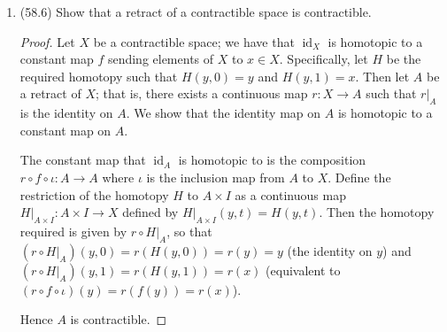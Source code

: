 \documentclass[11pt]{article}
\newcommand{\cbr}[1]{\left\{#1\right\}}
\DeclareMathOperator{\id}{id}
\begin{document}
\begin{enumerate}
\begin{proof}
      Conversely, suppose that $\id_X$ is homotopic to a constant map $f$ on $X$ mapping $X$ to some point $x\in X$. We can take the subspace $\cbr{x}$ to be the one-point space desired. Using the inclusion map $\iota$ from $\cbr{x}$ into $X$, and defining $g$ to be the map $f$ with the range restricted to $\cbr{x}$, we have that $\iota\circ g$ is equivalent to the map $f$, which is homotopic to the identity map. Similarly, the map $g\circ \iota$ is a map from $\cbr{x}$ to itself which is homotopic to the identity map on $\cbr{x}$ (since that is just what the composition is anyways). Thus $X$ has the homotopy type of a one-point space.

      Hence $X$ is contractible if and only if $X$ has the homotopy type of a one-point space.
    \end{proof}
    \item (58.6) Show that a retract of a contractible space is contractible.
    \begin{proof}
      Let $X$ be a contractible space; we have that $\id_X$ is homotopic to a constant map $f$ sending elements of $X$ to $x\in X$. Specifically, let $H$ be the required homotopy such that $H(y,0) = y$ and $H(y,1) = x$. Then let $A$ be a retract of $X$; that is, there exists a continuous map $r\colon X\to A$ such that $r|_A$ is the identity on $A$. We show that the identity map on $A$ is homotopic to a constant map on $A$. 

      The constant map that $\id_A$ is homotopic to is the composition $r\circ f\circ \iota\colon A\to A$ where $\iota$ is the inclusion map from $A$ to $X$. Define the restriction of the homotopy $H$ to ${A\times I}$ as a continuous map $H|_{A\times I}\colon A\times I \to X$ defined by $H|_{A\times I}(y,t) = H(y,t)$. Then the homotopy required is given by $r\circ H|_A$, so that $(r\circ H|_A)(y,0) = r(H(y,0)) = r(y) = y$ (the identity on $y$) and $(r\circ H|_A)(y,1) = r(H(y,1)) = r(x)$ (equivalent to $(r\circ f\circ \iota)(y) = r(f(y)) = r(x)$). 
      
      Hence $A$ is contractible. 
    \end{proof}
\end{enumerate}
\end{document}
